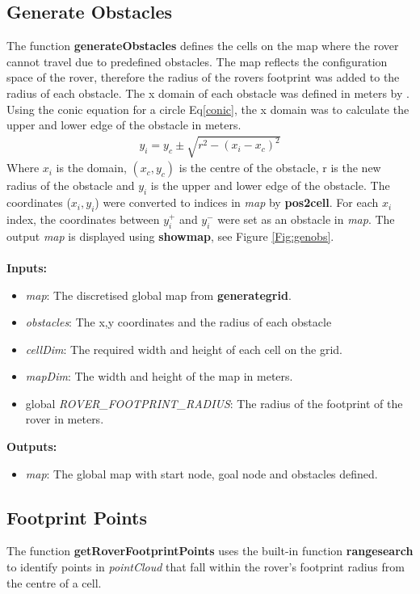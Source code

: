 \documentclass[Space3_Assign3.tex]{subfile}
\begin{document}
\subsection{Generate Obstacles} \label{Sec:genobs}
The function \textbf{generateObstacles} defines the cells on the map where the rover cannot travel due to predefined obstacles. The map reflects the configuration space of the rover, therefore the radius of the rovers footprint was added to the radius of each obstacle. The x domain of each obstacle was defined in meters \dis by . Using the conic equation for a circle Eq\eqref{conic}, the x domain was to calculate the upper and lower edge of the obstacle in meters.
\begin{eqnarray}
y_i = y_c \pm \sqrt{r^2 - (x_i -x_c)^2} \label{conic}
\end{eqnarray}
Where $x_i$ is the \dis domain, $(x_c,y_c)$ is the centre of the obstacle, r is the new radius of the obstacle and $y_i$ is the \dis upper and lower edge of the obstacle. The coordinates ($x_i,y_i$) were converted to indices in \textit{map} by \textbf{pos2cell}. For each $x_i$ index, the coordinates between $y_i^+$ and $y_i^-$ were set as an obstacle in \textit{map}. The output \textit{map} is displayed using \textbf{showmap}, see Figure \ref{Fig:genobs}.\\\\
\noindent\textbf{Inputs:}
\begin{itemize}
\item \textit{map}: The discretised global map from \textbf{generategrid}.
\item \textit{obstacles}: The x,y coordinates and the radius of each obstacle
\item \textit{cellDim}: The required width and height of each cell on the grid.
\item \textit{mapDim}: The width and height of the map in meters.
\item global \textit{ROVER\_FOOTPRINT\_RADIUS}: The radius of the footprint of the rover in meters.
\end{itemize}
\textbf{Outputs:}
\begin{itemize}
\item \textit{map}: The \dis global map with start node, goal node and obstacles defined.
\end{itemize}

\subsection{Footprint Points}
The function \textbf{getRoverFootprintPoints} uses the built-in function \textbf{rangesearch} to identify points in \textit{pointCloud} that fall within the rover's footprint radius from the centre of a cell.
\end{document}
